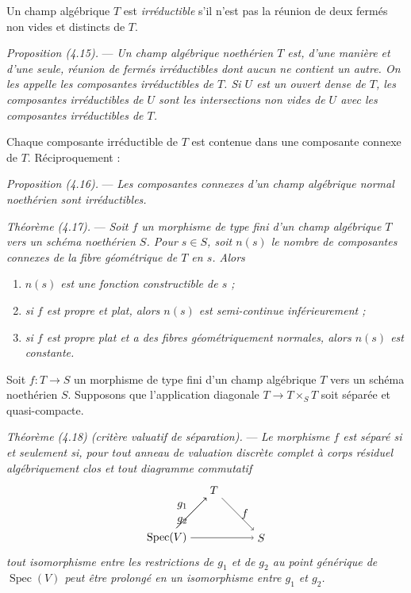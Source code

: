 \documentclass[10pt]{article}
\newcommand{\Spec}{\operatorname{Spec}}
\begin{document}
Un champ algébrique $T$ est \emph{irréductible} s'il n'est pas la réunion de deux fermés non vides et distincts de $T$.

\medskip
\noindent\emph{Proposition (4.15).} --- \emph{Un champ algébrique noethérien $T$ est, d'une manière et d'une seule, réunion de fermés irréductibles dont aucun ne contient un autre. On les appelle les composantes irréductibles de $T$. Si $U$ est un ouvert dense de $T$, les composantes irréductibles de $U$ sont les intersections non vides de $U$ avec les composantes irréductibles de $T$.}

Chaque composante irréductible de $T$ est contenue dans une composante connexe de $T$. Réciproquement :

\medskip
\noindent\emph{Proposition (4.16).} --- \emph{Les composantes connexes d'un champ algébrique normal noethérien sont irréductibles.}

\medskip
\noindent\emph{Théorème (4.17).} --- \emph{Soit $f$ un morphisme de type fini d'un champ algébrique $T$ vers un schéma noethérien $S$. Pour $s\in S$, soit $n(s)$ le nombre de composantes connexes de la fibre géométrique de $T$ en $s$. Alors}
\begin{enumerate}[label=(\roman*)]
\item \emph{$n(s)$ est une fonction constructible de $s$ ;}
\item \emph{si $f$ est propre et plat, alors $n(s)$ est semi-continue inférieurement ;}
\item \emph{si $f$ est propre plat et a des fibres géométriquement normales, alors $n(s)$ est constante.}
\end{enumerate}

Soit $f:T\to S$ un morphisme de type fini d'un champ algébrique $T$ vers un schéma noethérien $S$. Supposons que l'application diagonale $T\to T\times_S T$ soit séparée et quasi-compacte.

\medskip
\noindent\emph{Théorème (4.18) (critère valuatif de séparation).} --- \emph{Le morphisme $f$ est séparé si et seulement si, pour tout anneau de valuation discrète complet à corps résiduel algébriquement clos et tout diagramme commutatif}
\[
\begin{tikzpicture}[baseline=(current bounding box.center)]
\node (T) at (1.5,1.5) {$T$};
\node (V) at (0,0) {$\Spec(V)$};
\node (S) at (3,0) {$S$};
\draw[->] (V) -- node[above left] {$g_1$} (T);
\draw[->] (V) -- node[below left] {$g_2$} (T);
\draw[->] (V) -- (S);
\draw[->] (T) -- node[right] {$f$} (S);
\end{tikzpicture}
\]
\emph{tout isomorphisme entre les restrictions de $g_1$ et de $g_2$ au point générique de $\Spec(V)$ peut être prolongé en un isomorphisme entre $g_1$ et $g_2$.}
\end{document}
